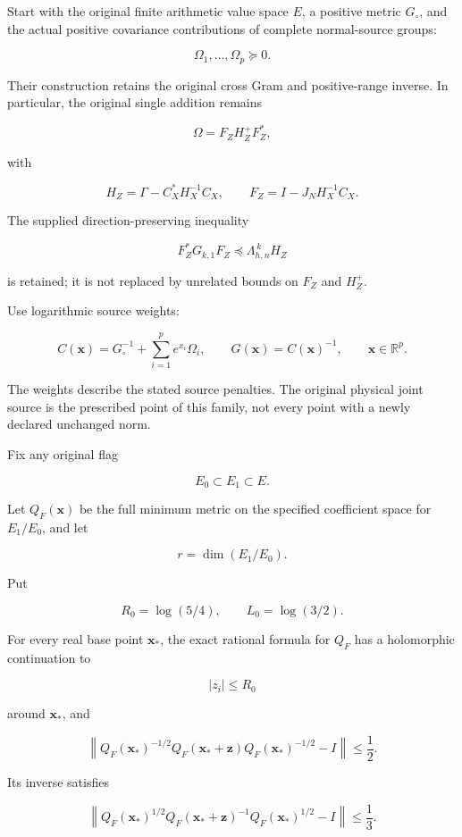 \documentclass[11pt]{article}
\begin{document}
Start with the original finite arithmetic value space \(E\), a positive metric \(G_\circ\), and the actual positive covariance contributions of complete normal-source groups:

\[
\Omega_1,\ldots,\Omega_p\succeq0.
\]

Their construction retains the original cross Gram and positive-range inverse. In particular, the original single addition remains

\[
\Omega=F_ZH_Z^+F_Z^*,
\]

with

\[
H_Z=\Gamma-C_X^*H_X^{-1}C_X,
\qquad
F_Z=I-J_NH_X^{-1}C_X.
\]

The supplied direction-preserving inequality

\[
F_Z^*G_{k,1}F_Z\preceq \Lambda_{h,n}^{\,k}H_Z
\]

is retained; it is not replaced by unrelated bounds on \(F_Z\) and \(H_Z^+\).

Use logarithmic source weights:

\[
\boxed{
C(\mathbf x)=G_\circ^{-1}+\sum_{i=1}^p e^{x_i}\Omega_i,
\qquad
G(\mathbf x)=C(\mathbf x)^{-1},
\qquad
\mathbf x\in\mathbb R^p.
}
\tag{4}
\]

The weights describe the stated source penalties. The original physical joint source is the prescribed point of this family, not every point with a newly declared unchanged norm.

Fix any original flag

\[
E_0\subset E_1\subset E.
\]

Let \(Q_F(\mathbf x)\) be the full minimum metric on the specified coefficient space for \(E_1/E_0\), and let

\[
r=\dim(E_1/E_0).
\]

Put

\[
R_0=\log(5/4),\qquad L_0=\log(3/2).
\]

For every real base point \(\mathbf x_*\), the exact rational formula for \(Q_F\) has a holomorphic continuation to

\[
|z_i|\le R_0
\]

around \(\mathbf x_*\), and

\[
\boxed{
\left\|
Q_F(\mathbf x_*)^{-1/2}
Q_F(\mathbf x_*+\mathbf z)
Q_F(\mathbf x_*)^{-1/2}
-I
\right\|
\le\frac12.
}
\tag{5}
\]

Its inverse satisfies

\[
\boxed{
\left\|
Q_F(\mathbf x_*)^{1/2}
Q_F(\mathbf x_*+\mathbf z)^{-1}
Q_F(\mathbf x_*)^{1/2}
-I
\right\|
\le\frac13.
}
\tag{6}
\]
\end{document}
